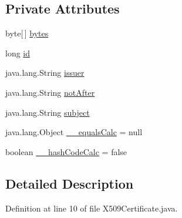 \subsection*{Private Attributes}
\begin{DoxyCompactItemize}
\item 
byte\mbox{[}$\,$\mbox{]} \hyperlink{classorg_1_1glite_1_1security_1_1voms_1_1service_1_1certificates_1_1X509Certificate_a633565ab1518573f1ccd3aafac7c025d}{bytes}
\item 
long \hyperlink{classorg_1_1glite_1_1security_1_1voms_1_1service_1_1certificates_1_1X509Certificate_adb9d391bfa7d8329d3231f75ee989264}{id}
\item 
java.lang.String \hyperlink{classorg_1_1glite_1_1security_1_1voms_1_1service_1_1certificates_1_1X509Certificate_a77330c6d98cf740cd9bc094b386c4247}{issuer}
\item 
java.lang.String \hyperlink{classorg_1_1glite_1_1security_1_1voms_1_1service_1_1certificates_1_1X509Certificate_aef72b7697d657017ee1ab929089cfd0a}{notAfter}
\item 
java.lang.String \hyperlink{classorg_1_1glite_1_1security_1_1voms_1_1service_1_1certificates_1_1X509Certificate_a36270b55a287194a45068375ad65723e}{subject}
\item 
java.lang.Object \hyperlink{classorg_1_1glite_1_1security_1_1voms_1_1service_1_1certificates_1_1X509Certificate_aee6fef67193ba4fe895cc785946a3e02}{\_\-\_\-equalsCalc} = null
\item 
boolean \hyperlink{classorg_1_1glite_1_1security_1_1voms_1_1service_1_1certificates_1_1X509Certificate_ab83c16c95a2a9bdf0414b14dfddae230}{\_\-\_\-hashCodeCalc} = false
\end{DoxyCompactItemize}


\subsection{Detailed Description}


Definition at line 10 of file X509Certificate.java.



